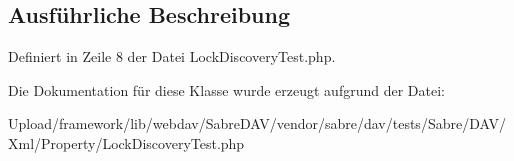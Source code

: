 \subsection{Ausführliche Beschreibung}


Definiert in Zeile 8 der Datei Lock\+Discovery\+Test.\+php.



Die Dokumentation für diese Klasse wurde erzeugt aufgrund der Datei\+:\begin{DoxyCompactItemize}
\item 
Upload/framework/lib/webdav/\+Sabre\+D\+A\+V/vendor/sabre/dav/tests/\+Sabre/\+D\+A\+V/\+Xml/\+Property/Lock\+Discovery\+Test.\+php\end{DoxyCompactItemize}
